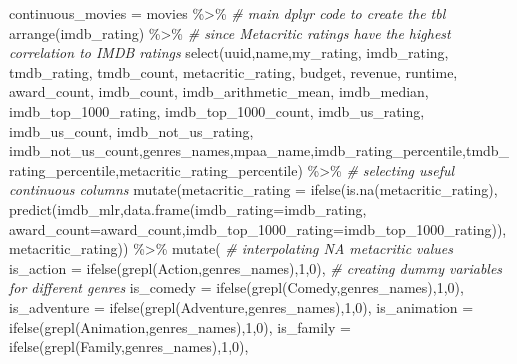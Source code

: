 \documentclass[
]{article}
\newenvironment{Shaded}{\begin{snugshade}}{\end{snugshade}}
\newcommand{\AttributeTok}[1]{\textcolor[rgb]{0.77,0.63,0.00}{#1}}
\newcommand{\CommentTok}[1]{\textcolor[rgb]{0.56,0.35,0.01}{\textit{#1}}}
\newcommand{\DecValTok}[1]{\textcolor[rgb]{0.00,0.00,0.81}{#1}}
\newcommand{\FunctionTok}[1]{\textcolor[rgb]{0.00,0.00,0.00}{#1}}
\newcommand{\NormalTok}[1]{#1}
\newcommand{\OtherTok}[1]{\textcolor[rgb]{0.56,0.35,0.01}{#1}}
\newcommand{\SpecialCharTok}[1]{\textcolor[rgb]{0.00,0.00,0.00}{#1}}
\newcommand{\StringTok}[1]{\textcolor[rgb]{0.31,0.60,0.02}{#1}}
\begin{document}
\begin{Shaded}
\begin{Highlighting}[]
\NormalTok{continuous\_movies }\OtherTok{=}\NormalTok{ movies }\SpecialCharTok{\%\textgreater{}\%} \CommentTok{\# main dplyr code to create the tbl}
  \FunctionTok{arrange}\NormalTok{(imdb\_rating) }\SpecialCharTok{\%\textgreater{}\%} \CommentTok{\# since Metacritic ratings have the highest correlation to IMDB ratings}
  \FunctionTok{select}\NormalTok{(uuid,name,my\_rating, imdb\_rating, tmdb\_rating, tmdb\_count, metacritic\_rating, budget, revenue, runtime, award\_count, imdb\_count, imdb\_arithmetic\_mean, imdb\_median, imdb\_top\_1000\_rating, imdb\_top\_1000\_count, imdb\_us\_rating, imdb\_us\_count, imdb\_not\_us\_rating, imdb\_not\_us\_count,genres\_names,mpaa\_name,imdb\_rating\_percentile,tmdb\_rating\_percentile,metacritic\_rating\_percentile) }\SpecialCharTok{\%\textgreater{}\%} \CommentTok{\# selecting useful continuous columns}
  \FunctionTok{mutate}\NormalTok{(}\AttributeTok{metacritic\_rating =} \FunctionTok{ifelse}\NormalTok{(}\FunctionTok{is.na}\NormalTok{(metacritic\_rating), }\FunctionTok{predict}\NormalTok{(imdb\_mlr,}\FunctionTok{data.frame}\NormalTok{(}\AttributeTok{imdb\_rating=}\NormalTok{imdb\_rating, }\AttributeTok{award\_count=}\NormalTok{award\_count,}\AttributeTok{imdb\_top\_1000\_rating=}\NormalTok{imdb\_top\_1000\_rating)), metacritic\_rating)) }\SpecialCharTok{\%\textgreater{}\%} \FunctionTok{mutate}\NormalTok{( }\CommentTok{\# interpolating NA metacritic values}
    \AttributeTok{is\_action =} \FunctionTok{ifelse}\NormalTok{(}\FunctionTok{grepl}\NormalTok{(}\StringTok{\textquotesingle{}Action\textquotesingle{}}\NormalTok{,genres\_names),}\DecValTok{1}\NormalTok{,}\DecValTok{0}\NormalTok{), }\CommentTok{\# creating dummy variables for different genres}
    \AttributeTok{is\_comedy =} \FunctionTok{ifelse}\NormalTok{(}\FunctionTok{grepl}\NormalTok{(}\StringTok{\textquotesingle{}Comedy\textquotesingle{}}\NormalTok{,genres\_names),}\DecValTok{1}\NormalTok{,}\DecValTok{0}\NormalTok{),}
    \AttributeTok{is\_adventure =} \FunctionTok{ifelse}\NormalTok{(}\FunctionTok{grepl}\NormalTok{(}\StringTok{\textquotesingle{}Adventure\textquotesingle{}}\NormalTok{,genres\_names),}\DecValTok{1}\NormalTok{,}\DecValTok{0}\NormalTok{),}
    \AttributeTok{is\_animation =} \FunctionTok{ifelse}\NormalTok{(}\FunctionTok{grepl}\NormalTok{(}\StringTok{\textquotesingle{}Animation\textquotesingle{}}\NormalTok{,genres\_names),}\DecValTok{1}\NormalTok{,}\DecValTok{0}\NormalTok{),}
    \AttributeTok{is\_family =} \FunctionTok{ifelse}\NormalTok{(}\FunctionTok{grepl}\NormalTok{(}\StringTok{\textquotesingle{}Family\textquotesingle{}}\NormalTok{,genres\_names),}\DecValTok{1}\NormalTok{,}\DecValTok{0}\NormalTok{),}

\end{Highlighting}
\end{Shaded}
\end{document}
